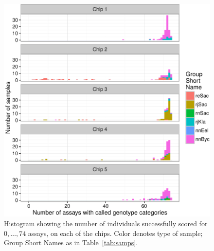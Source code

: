 \documentclass[twocolumn,natbib]{svjour3}       %
\begin{document}
\begin{figure}
\begin{center}
\includegraphics[width = \linewidth]{successful-assay-histogram-crop.pdf}
\end{center}
\caption{ Histogram showing the number of individuals
successfully scored for $0,\ldots, 74$ assays, on each of the chips.  Color denotes type of sample; Group Short
Names as in Table~\ref{tab:samps}.  \label{fig:success-histos}}
\end{figure}
\end{document}
